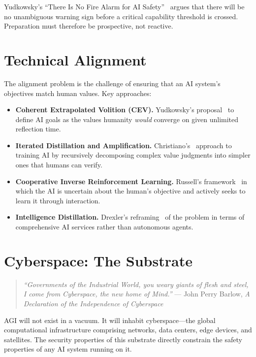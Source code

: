 \documentclass[11pt,twocolumn]{article}
\begin{document}
Yudkowsky's ``There Is No Fire Alarm for AI
Safety''~\cite{yudkowsky2017firealarm} argues that there will be no unambiguous
warning sign before a critical capability threshold is crossed. Preparation must
therefore be prospective, not reactive.

\section{Technical Alignment}
\label{sec:alignment}

The alignment problem is the challenge of ensuring that an AI system's objectives
match human values. Key approaches:

\begin{itemize}[leftmargin=1.1em]
    \item \textbf{Coherent Extrapolated Volition (CEV).} Yudkowsky's
    proposal~\cite{yudkowsky2004cev} to define AI goals as the values humanity
    \emph{would} converge on given unlimited reflection time.
    \item \textbf{Iterated Distillation and Amplification.}
    Christiano's~\cite{christiano2018alignment} approach to training AI by
    recursively decomposing complex value judgments into simpler ones that humans
    can verify.
    \item \textbf{Cooperative Inverse Reinforcement Learning.} Russell's
    framework~\cite{russell2016cooperative} in which the AI is uncertain about
    the human's objective and actively seeks to learn it through interaction.
    \item \textbf{Intelligence Distillation.} Drexler's
    reframing~\cite{drexler2019reframing} of the problem in terms of
    comprehensive AI services rather than autonomous agents.
\end{itemize}

\section{Cyberspace: The Substrate}
\label{sec:cyberspace}

\begin{quote}
\textit{``Governments of the Industrial World, you weary giants of flesh and
steel, I come from Cyberspace, the new home of Mind.''} --- John Perry Barlow,
\textit{A Declaration of the Independence of Cyberspace}
\end{quote}

AGI will not exist in a vacuum. It will inhabit cyberspace---the global
computational infrastructure comprising networks, data centers, edge devices,
and satellites. The security properties of this substrate directly constrain the
safety properties of any AI system running on it.
\end{document}
